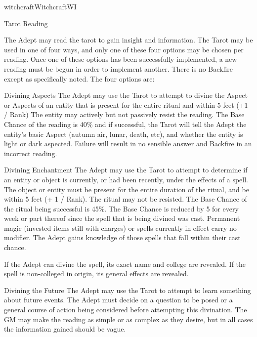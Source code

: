 \begin{college}[1.1]{witchcraft}{Witchcraft}{WI}
\begin{ritual}[Q-2]{Tarot Reading}

\begin{effects}
The Adept may read the tarot to gain insight and information.  The
Tarot may be used in one of four ways, and only one of these four
options may be chosen per reading.  Once one of these options has been
successfully implemented, a new reading must be begun in order to
implement another.  There is no Backfire except as specifically noted.
The four options are:

\begin{Description}
\item[Divining Aspects]
The Adept may use the Tarot to attempt to divine the Aspect or Aspects
of an entity that is present for the entire ritual and within 5 feet
(+1 / Rank) The entity may actively but not passively resist the
reading.  The Base Chance of the reading is 40\% and if successful,
the Tarot will tell the Adept the entity's basic Aspect (autumn air,
lunar, death, etc), and whether the entity is light or dark aspected.
Failure will result in no sensible answer and Backfire in an incorrect
reading.

\item[Divining Enchantment]
The Adept may use the Tarot to attempt to determine if an entity or
object is currently, or had been recently, under the effects of a
spell.  The object or entity must be present for the entire duration
of the ritual, and be within 5 feet (+ 1 / Rank).  The ritual may not
be resisted.  The Base Chance of the ritual being successful is 45\%.
The Base Chance is reduced by 5 for every week or part thereof since
the spell that is being divined was cast.  Permanent magic (\eg invested
items still with charges) or spells currently in effect carry
no modifier.  The Adept gains knowledge of those spells that fall
within their cast chance.

If the Adept can divine the spell, its exact name and college are
revealed.  If the spell is non-colleged in origin, its general effects
are revealed.

\item[Divining the Future]
The Adept may use the Tarot to attempt to learn something about future
events.  The Adept must decide on a question to be posed or a general
course of action being considered before attempting this divination.
The GM may make the reading as simple or as complex as they desire,
but in all cases the information gained should be vague.


\end{Description}
\end{effects}
\end{ritual}
\end{college}
